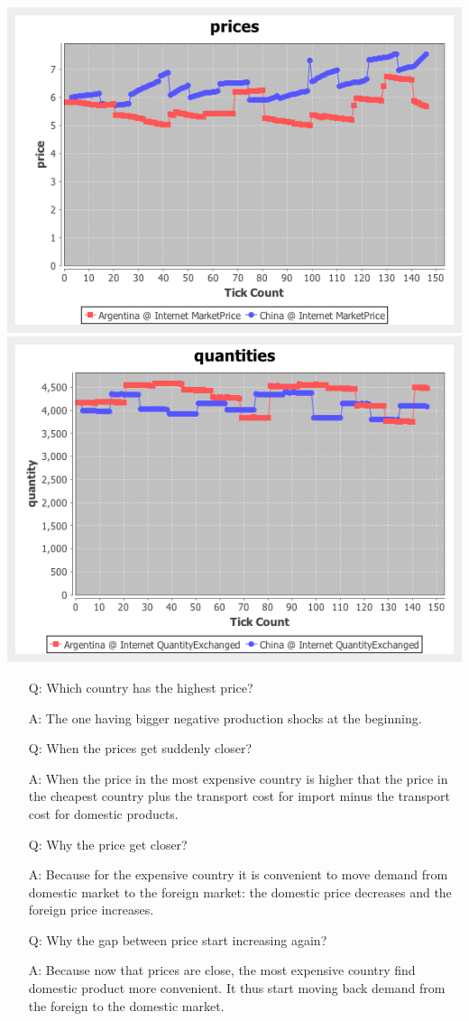 \documentclass{article}
\begin{document}
\vskip2mm
\hskip-2cm
\includegraphics[scale=0.4]{fig_case2_prices}
\includegraphics[scale=0.4]{fig_case2_quantities}

\begin{itemize}
	\item [Q:] Which country has the highest price?
	\item [A:] The one having bigger negative production shocks at the beginning.
	\item [Q:] When the prices get suddenly closer?
	\item [A:] When the price in the most expensive country is higher that the price in the cheapest country plus the transport cost for import minus the transport cost for domestic products.  
	\item [Q:] Why the price get closer? 
	\item [A:] Because for the expensive country it is convenient to move demand from domestic market to the foreign market: the domestic price decreases and the foreign price increases.
	\item [Q:] Why the gap between price start increasing again? 
	\item [A:] Because now that prices are close, the most expensive country find domestic product more convenient. It thus start moving back demand from the foreign to the domestic market. 

\end{itemize}
\end{document}
